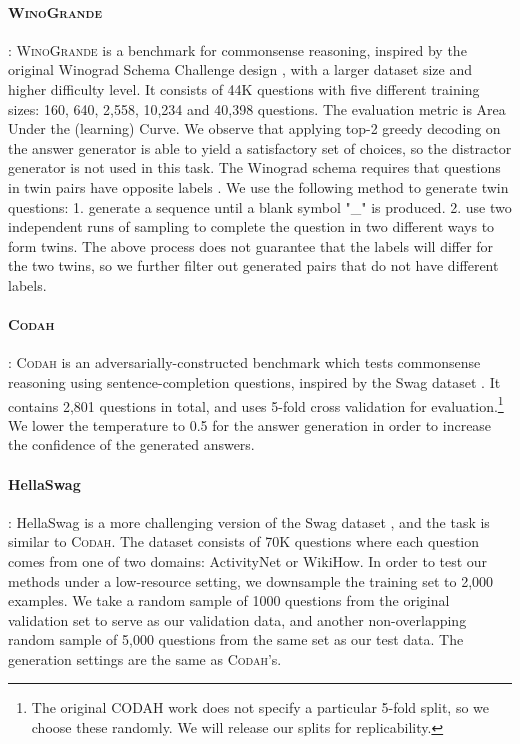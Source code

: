 \documentclass[11pt,a4paper]{article}
\newcommand{\winogrande}{\textsc{WinoGrande}\xspace}
\newcommand{\codah}{\textsc{Codah}\xspace}
\begin{document}
\paragraph{\winogrande} \cite{sakaguchi2019winogrande}: \winogrande is a benchmark for commonsense reasoning, inspired by the original Winograd Schema Challenge design \cite{Levesque2011TheWS}, with a larger dataset size and higher difficulty level. It consists of 44K questions with five different training sizes: 160, 640, 2,558, 10,234 and 40,398 questions. The evaluation metric is Area Under the (learning) Curve. We observe that applying top-2 greedy decoding on the answer generator is able to yield a satisfactory set of choices, so the distractor generator is not used in this task.  The Winograd schema requires that questions in twin pairs have opposite labels \cite{Levesque2011TheWS}.  We use the following method to generate twin questions: 1. generate a sequence until a blank symbol "\_" is produced. 2. use two independent runs of sampling to complete the question in two different ways to form twins. The above process does not guarantee that the labels will differ for the two twins, so we further filter out generated pairs that do not have different labels.
\paragraph{\codah} \cite{Chen2019CODAHAA}: \codah is an adversarially-constructed benchmark which tests commonsense reasoning using sentence-completion questions, inspired by the Swag dataset \cite{zellers2018swagaf}. It contains 2,801 questions in total, and uses 5-fold cross validation for evaluation.\footnote{The original CODAH work does not specify a particular 5-fold split, so we choose these randomly.  We will release our splits for replicability.} We lower the temperature to 0.5 for the answer generation in order to increase the confidence of the generated answers. 
\paragraph{HellaSwag} \cite{zellers2019hellaswag}: HellaSwag is a more challenging version of the Swag dataset \cite{zellers2018swagaf}, and the task is similar to \codah. The dataset consists of 70K questions where each question comes from one of two domains: ActivityNet or WikiHow. In order to test our methods under a low-resource setting, we downsample the training set to 2,000 examples. We take a random sample of 1000 questions from the original validation set to serve as our validation data, and another non-overlapping random sample of 5,000 questions from the same set as our test data. The generation settings are the same as \codah's.
\end{document}
